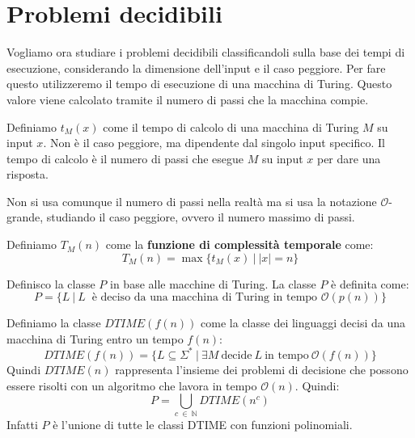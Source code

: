 \section{Problemi decidibili}
Vogliamo ora studiare i problemi decidibili classificandoli sulla base dei tempi
di esecuzione, considerando la dimensione dell'input e il caso peggiore. Per fare
questo utilizzeremo il tempo di esecuzione di una macchina di Turing. Questo
valore viene calcolato tramite il numero di passi che la macchina compie.
\begin{definizione}
    Definiamo $t_M(x)$ come il tempo di calcolo di una macchina di Turing $M$ su
    input $x$. Non è il caso peggiore, ma dipendente dal singolo input specifico.
    Il tempo di calcolo è il numero di passi che esegue $M$ su input $x$ per
    dare una risposta.
\end{definizione}
Non si usa comunque il numero di passi nella realtà ma si usa la notazione
$\mathcal{O}$-grande, studiando il caso peggiore, ovvero il numero massimo di
passi.
\begin{definizione}
    Definiamo $T_M(n)$ come la \textbf{funzione di complessità temporale} come:
    \begin{equation}
        T_M(n) = \max \{t_M(x) \ | \ |x| = n\}
    \end{equation}
\end{definizione}
\begin{definizione}
    Definisco la classe $P$ in base alle macchine di Turing. La classe $P$ è
    definita come:
    \begin{equation}
        P = \{L \ | \ L \ \text{ è deciso da una macchina di Turing in tempo }
        \mathcal{O}(p(n))\}
    \end{equation}
\end{definizione}
\begin{definizione}
    Definiamo la classe $DTIME(f(n))$ come la classe dei linguaggi decisi da una
    macchina di Turing entro un tempo $f(n)$:
    \begin{equation}
        DTIME(f(n)) = \{L \subseteq \Sigma^{\ast} \ | \ \exists M \
        \text{decide} \ L \ \text{in tempo} \ \mathcal{O}(f(n)) \}
    \end{equation}
    Quindi $DTIME(n)$ rappresenta l'insieme dei problemi di decisione che possono
    essere risolti con un algoritmo che lavora in tempo $\mathcal{O}(n)$. Quindi:
    \begin{equation}
        P = \bigcup_{c \ \in \ \mathbb{N}} DTIME(n^c)
    \end{equation}
    Infatti $P$ è l'unione di tutte le classi DTIME con funzioni polinomiali.
\end{definizione}
